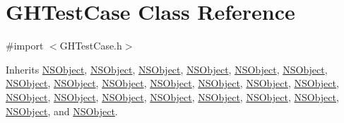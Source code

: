 \hypertarget{interface_g_h_test_case}{
\section{\-G\-H\-Test\-Case \-Class \-Reference}
\label{interface_g_h_test_case}
}


{\ttfamily \#import $<$\-G\-H\-Test\-Case.\-h$>$}



\-Inherits \hyperlink{class_n_s_object}{\-N\-S\-Object}, \hyperlink{class_n_s_object}{\-N\-S\-Object}, \hyperlink{class_n_s_object}{\-N\-S\-Object}, \hyperlink{class_n_s_object}{\-N\-S\-Object}, \hyperlink{class_n_s_object}{\-N\-S\-Object}, \hyperlink{class_n_s_object}{\-N\-S\-Object}, \hyperlink{class_n_s_object}{\-N\-S\-Object}, \hyperlink{class_n_s_object}{\-N\-S\-Object}, \hyperlink{class_n_s_object}{\-N\-S\-Object}, \hyperlink{class_n_s_object}{\-N\-S\-Object}, \hyperlink{class_n_s_object}{\-N\-S\-Object}, \hyperlink{class_n_s_object}{\-N\-S\-Object}, \hyperlink{class_n_s_object}{\-N\-S\-Object}, \hyperlink{class_n_s_object}{\-N\-S\-Object}, \hyperlink{class_n_s_object}{\-N\-S\-Object}, \hyperlink{class_n_s_object}{\-N\-S\-Object}, \hyperlink{class_n_s_object}{\-N\-S\-Object}, \hyperlink{class_n_s_object}{\-N\-S\-Object}, \hyperlink{class_n_s_object}{\-N\-S\-Object}, \hyperlink{class_n_s_object}{\-N\-S\-Object}, \hyperlink{class_n_s_object}{\-N\-S\-Object}, and \hyperlink{class_n_s_object}{\-N\-S\-Object}.



